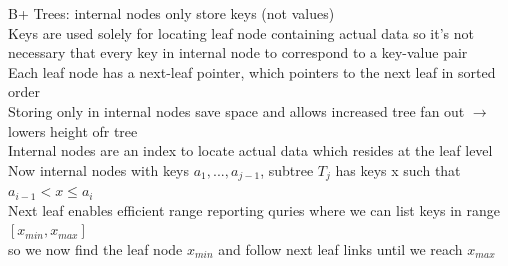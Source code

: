 \documentclass{article}
\begin{document}
  B+ Trees: internal nodes only store keys (not values)\\
  Keys are used solely for locating leaf node containing actual data so it's not necessary that every key in internal node to correspond to a key-value pair\\
  Each leaf node has a next-leaf pointer, which pointers to the next leaf in sorted order \\
  Storing only in internal nodes save space and allows increased tree fan out $\rightarrow$ lowers height ofr tree\\
  Internal nodes are an index to locate actual data which resides at the leaf level\\
  Now internal nodes with keys $a_{1}, ..., a_{j-1}$, subtree $T_{j}$ has keys x such that $a_{i-1} < x \leq a_{i}$\\
  Next leaf enables efficient range reporting quries where we can list keys in range $[x_{min}, x_{max}]$\\
  \indent so we now find the leaf node $x_{min}$ and follow next leaf links until we reach $x_{max}$\\
  \newpage
\end{document}
